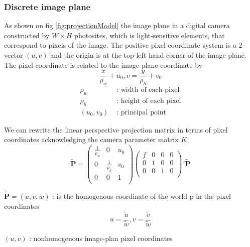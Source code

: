 \documentclass[journal,final,a4paper,twoside]{PS}
\begin{document}
\subsubsection{Discrete image plane}
As shown on fig \ref{fig:projectionModel} the image plane in a digital camera constructed by $ W\times H $ photosites, which is light-sensitive elements, that correspond to pixels of the image.  The positive pixel coordinate system is a $2$--vector $(u,v)$ and the origin is at the top-left hand corner of the image plane.
The pixel coordinate is related to the image-plane coordinate by
\begin{equation}\frac{x}{\rho_w} + u_0, v = \frac{y}{\rho_h}+v_0\end{equation}
\begin{align*}
\rho_w&\text{ :  width of each pixel}\\
\rho_h&\text{  :  height of each pixel}\\
(u_0,v_0)&\text{  :  principal point}
\end{align*}

We can rewrite the linear perspective projection matrix in terms of pixel coordinates acknowledging the camera parameter matrix  $K$
\begin{equation}
\tilde{\textbf{P}}= \begin{pmatrix}
\frac{1}{\rho_w}&0&u_0\\
0&\frac{1}{\rho_h}&v_0\\
0&0&1\\
\end{pmatrix}\begin{pmatrix}
f&0&0&0\\
0&1&0&0\\
0&0&1&0\\
\end{pmatrix}{}^{c}\tilde{\textbf{P}}
\end{equation}

$\tilde{\textbf{P}}=(\tilde{u},\tilde{v},\tilde{w})$ : is the homogenous coordinate of the world p in the pixel coordinates
\begin{equation}
u= \frac{\tilde{u}}{\tilde{w}}, v= \frac{\tilde{v}}{\tilde{w}}
\end{equation}

$(u,v)$ : nonhomogenous image-plan pixel coordinates
\end{document}
